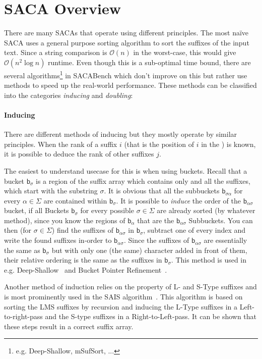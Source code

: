 \section{SACA Overview}

There are many SACAs that operate using different principles.
The most na\"ive SACA uses a general purpose sorting algorithm to sort the suffixes of the input text.
Since a string comparison is $\mathcal O (n)$ in the worst-case, this would give $\mathcal O (n^2 \log n)$ runtime.
Even though this is a sub-optimal time bound,
there are several algorithms\footnote{e.g. Deep-Shallow, mSufSort, ...} in SACABench which don't improve on this
but rather use methods to speed up the real-world performance.
These methods can be classified into the categories \emph{inducing} and \emph{doubling}:
%
\paragraph{Inducing} %
There are different methods of inducing but they mostly operate by similar principles.
When the rank of a suffix $i$ (that is the position of $i$ in the \sa) is known,
it is possible to deduce the rank of other suffixes $j$.

The easiest to understand usecase for this is when using buckets.
Recall that a bucket $\mathsf b_{\sigma}$ is a region of the suffix
array which contains only and all the suffixes,
which start with the substring $\sigma$.
It is obvious that all the subbuckets $\mathsf b_{\sigma\alpha}$ for
every $\alpha \in \Sigma$ are contained within $\mathsf b_\sigma$.
It is possible to \emph{induce} the order of the $\mathsf b_{\alpha\sigma}$ bucket,
if all Buckets $\mathsf b_\sigma$ for every possible $\sigma \in \Sigma$ are already sorted (by whatever method),
since you know the regions of $\mathsf b_\alpha$ that are the $\mathsf b_{\alpha\sigma}$ Subbuckets.
You can then (for $\sigma \in \Sigma$) find the suffixes of $\mathsf b_{\alpha\sigma}$ in $\mathsf b_{\sigma}$,
subtract one of every index and write the found suffixes in-order to $\mathsf b_{\alpha\sigma}$.
Since the suffixes of $\mathsf b_{\alpha\sigma}$ are essentially the same as $\mathsf b_\sigma$ but
with only one (the same) character added in front of them,
their relative ordering is the same as the suffixes in $\mathsf b_\sigma$.
This method is used in e.g. Deep-Shallow~\cite{saca:4} and 
Bucket Pointer Refinement~\cite{saca:2}.

Another method of induction relies on the property of L- and S-Type suffixes and
is most prominently used in the SAIS algorithm~\cite{saca:6}.
This algorithm is based on sorting the LMS suffixes by recursion
and inducing the L-Type suffixes in a Left-to-right-pass and the S-type suffixes in a Right-to-Left-pass.
It can be shown that these steps result in a correct suffix array.

